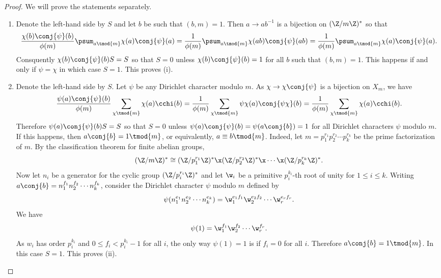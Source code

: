       \begin{proof}
        We will prove the statements separately.
        \begin{enumerate}[label=(\roman*)]
          \item Denote the left-hand side by $S$ and let $b$ be such that $(b,m) = 1$. Then $a \to ab^{-1}$ is a bijection on $(\Z/m\Z)^{\ast}$ so that
          \[
            \frac{\chi(b)\conj{\psi}(b)}{\phi(m)}\psum_{a \tmod{m}}\chi(a)\conj{\psi}(a) = \frac{1}{\phi(m)}\psum_{a \tmod{m}}\chi(ab)\conj{\psi}(ab) = \frac{1}{\phi(m)}\psum_{a \tmod{m}}\chi(a)\conj{\psi}(a).
          \]
          Consquently $\chi(b)\conj{\psi}(b)S = S$ so that $S = 0$ unless $\chi(b)\conj{\psi}(b) = 1$ for all $b$ such that $(b,m) = 1$. This happens if and only if $\psi = \chi$ in which case $S = 1$. This proves (i).
          \item Denote the left-hand side by $S$. Let $\psi$ be any Dirichlet character modulo $m$. As $\chi \to \chi\conj{\psi}$ is a bijection on $X_{m}$, we have
          \[
            \frac{\psi(a)\conj{\psi}(b)}{\phi(m)}\sum_{\chi \tmod{m}}\chi(a)\cchi(b) = \frac{1}{\phi(m)}\sum_{\chi \tmod{m}}\psi\chi(a)\conj{\psi\chi}(b) = \frac{1}{\phi(m)}\sum_{\chi \tmod{m}}\chi(a)\cchi(b).
          \]
          Therefore $\psi(a)\conj{\psi}(b)S = S$ so that $S = 0$ unless $\psi(a)\conj{\psi}(b) = \psi(a\conj{b}) = 1$ for all Dirichlet characters $\psi$ modulo $m$. If this happens, then $a\conj{b} = 1 \tmod{m}$, or equivalently, $a \equiv b \tmod{m}$. Indeed, let $m = p_{1}^{r_{1}}p_{2}^{r_{2}} \cdots p_{k}^{r_{k}}$ be the prime factorization of $m$. By the classification theorem for finite abelian groups,
          \[
            (\Z/m\Z)^{\ast} \cong (\Z/p_{1}^{r_{1}}\Z)^{\ast} \x (\Z/p_{2}^{r_{2}}\Z)^{\ast} \x \cdots \x (\Z/p_{k}^{r_{k}}\Z)^{\ast}.
          \]
          Now let $n_{i}$ be a generator for the cyclic group $(\Z/p_{i}^{r_{i}}\Z)^{\ast}$ and let $\w_{i}$ be a primitive $p_{i}^{k_{i}}$-th root of unity for $1 \le i \le k$. Writing $a\conj{b} = n_{1}^{f_{1}}n_{2}^{f_{2}} \cdots n_{k}^{f_{k}}$, consider the Dirichlet character $\psi$ modulo $m$ defined by
          \[
            \psi(n_{1}^{e_{1}}n_{2}^{e_{2}} \cdots n_{k}^{e_{k}}) = \w_{1}^{e_{1}f_{1}}\w_{2}^{e_{2}f_{2}} \cdots \w_{r}^{e_{r}f_{r}}.
          \]
          We have
          \[
            \psi(1) = \w_{1}^{f_{1}}\w_{2}^{f_{2}} \cdots \w_{r}^{f_{r}}.
          \]
          As $w_{i}$ has order $p_{i}^{k_{i}}$ and $0 \le f_{i} < p_{i}^{k_{i}}-1$ for all $i$, the only way $\psi(1) = 1$ is if $f_{i} = 0$ for all $i$. Therefore $a\conj{b} = 1 \tmod{m}$. In this case $S = 1$. This proves (ii).
        \end{enumerate}
      \end{proof}

